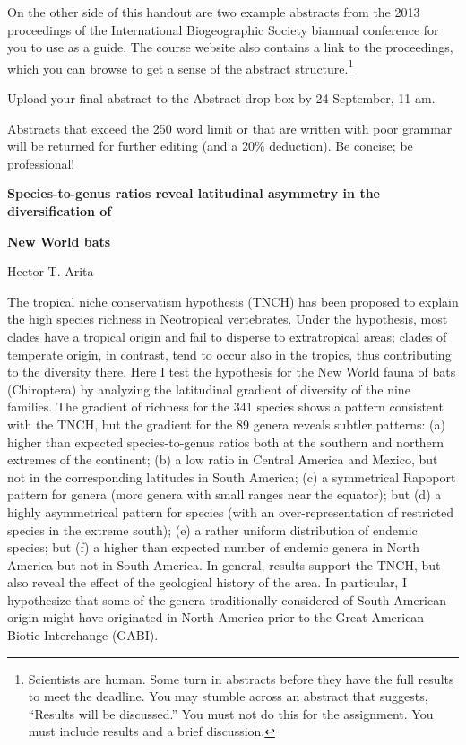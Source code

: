 \documentclass[11pt]{article}
\begin{document}
On the other side of this handout are two example abstracts from the
2013 proceedings of the International Biogeographic Society biannual
conference for you to use as a guide. The course website also contains a
link to the proceedings, which you can browse to get a sense of the
abstract structure.\footnote{Scientists are human. Some turn in abstracts
  before they have the full results to meet the deadline. You may
  stumble across an abstract that suggests, ``Results will be
  discussed.'' You must not do this for the assignment. You must include
  results and a brief discussion.}

Upload your final abstract to the Abstract drop box by 24 September, 11 am.

Abstracts that exceed the 250 word limit or that are written with poor
grammar will be returned for further editing (and a 20\% deduction). Be
concise; be professional!

\newpage

\textbf{Species-to-genus ratios reveal latitudinal asymmetry in the
diversification of}

\textbf{New World bats}

Hector T. Arita

The tropical niche conservatism hypothesis (TNCH) has been proposed to
explain the high species richness in Neotropical vertebrates. Under the
hypothesis, most clades have a tropical origin and fail to disperse to
extratropical areas; clades of temperate origin, in contrast, tend to
occur also in the tropics, thus contributing to the diversity there.
Here I test the hypothesis for the New World fauna of bats (Chiroptera)
by analyzing the latitudinal gradient of diversity of the nine families.
The gradient of richness for the 341 species shows a pattern consistent
with the TNCH, but the gradient for the 89 genera reveals subtler
patterns: (a) higher than expected species-to-genus ratios both at the
southern and northern extremes of the continent; (b) a low ratio in
Central America and Mexico, but not in the corresponding latitudes in
South America; (c) a symmetrical Rapoport pattern for genera (more
genera with small ranges near the equator); but (d) a highly
asymmetrical pattern for species (with an over-representation of
restricted species in the extreme south); (e) a rather uniform
distribution of endemic species; but (f) a higher than expected number
of endemic genera in North America but not in South America. In general,
results support the TNCH, but also reveal the effect of the geological
history of the area. In particular, I hypothesize that some of the
genera traditionally considered of South American origin might have
originated in North America prior to the Great American Biotic
Interchange (GABI).
\end{document}
